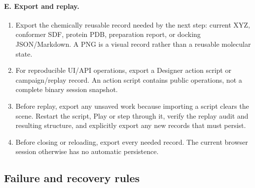 \documentclass[11pt]{article}
\begin{document}
\begin{small}
\paragraph{E. Export and replay.}
\begin{enumerate}[leftmargin=*]
\item Export the chemically reusable record needed by the next step: current XYZ, conformer SDF, protein PDB, preparation report, or docking JSON/Markdown. A PNG is a visual record rather than a reusable molecular state.
\item For reproducible UI/API operations, export a Designer action script or campaign/replay record. An action script contains public operations, not a complete binary session snapshot.
\item Before replay, export any unsaved work because importing a script clears the scene. Restart the script, Play or step through it, verify the replay audit and resulting structure, and explicitly export any new records that must persist.
\item Before closing or reloading, export every needed record. The current browser session otherwise has no automatic persistence.
\end{enumerate}

\subsection{Failure and recovery rules}\label{appB:sec24}


\end{small}
\end{document}
